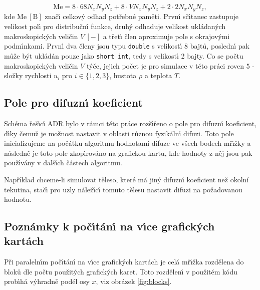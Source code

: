         \begin{equation}
            \mathrm{Me} = 8 \cdot 68 N_x N_y N_z + 8 \cdot V N_x N_y N_z + 2 \cdot 2 N_x N_y N_z,
        \end{equation}
        kde $\mathrm{Me} \ [\mathrm{B}]$ zna\v{c}\'{\i} celkov\'{y} odhad pot\v{r}ebn\'{e} pam\v{e}ti. Prvn\'{\i} s\v{c}\'{\i}tanec zastupuje velikost pol\'{\i} pro distribu\v{c}n\'{\i} funkce, druh\'{y} odhaduje velikost ukl\'{a}dan\'{y}ch makroskopick\'{y}ch veli\v{c}in $V \ [-]$ a t\v{r}et\'{\i} \v{c}len aproximuje pole s okrajov\'{y}mi podm\'{\i}nkami. Prvn\'{\i} dva \v{c}leny jsou typu \texttt{\lstinline{double}} s velikost\'{\i} 8 bajt\r{u}, posledn\'{\i} pak m\r{u}\v{z}e b\'{y}t ukl\'{a}d\'{a}n pouze jako \texttt{\lstinline{short int}}, tedy s velikost\'{\i} 2 bajty. Co se po\v{c}tu makroskopick\'{y}ch veli\v{c}in $V$ t\'{y}\v{c}e, jejich po\v{c}et je pro simulace v t\'{e}to pr\'{a}ci roven $5$ - slo\v{z}ky rychlosti $u_i$ pro $i \in \{1,2,3\}$, hustota $\rho$ a teplota $T$.

        \subsection{Pole pro difuzn\'{\i} koeficient}
            
            Sch\'{e}ma \v{r}e\v{s}\'{\i}c\'{\i} ADR bylo v r\'{a}mci t\'{e}to pr\'{a}ce roz\v{s}\'{\i}\v{r}eno o pole pro difuzn\'{\i} koeficient, d\'{\i}ky \v{c}emu\v{z} je mo\v{z}nost nastavit v oblasti r\r{u}znou fyzik\'{a}ln\'{\i} difuzi. Toto pole inicializujeme na po\v{c}\'{a}tku algoritmu hodnotami difuze ve v\v{s}ech bodech m\v{r}\'{\i}\v{z}ky a n\'{a}sledn\v{e} je toto pole zkop\'{\i}rov\'{a}no na grafickou kartu, kde hodnoty z n\v{e}j jsou pak pou\v{z}\'{\i}v\'{a}ny v dal\v{s}\'{\i}ch \v{c}\'{a}stech algoritmu. 

            Nap\v{r}\'{\i}klad chceme-li simulovat t\v{e}leso, kter\'{e} m\'{a} jin\'{y} difuzn\'{\i} koeficient ne\v{z} okoln\'{i} tekutina, sta\v{c}\'{\i} pro uzly n\'{a}le\v{z}\'{\i}c\'{\i} tomuto t\v{e}lesu nastavit difuzi na po\v{z}adovanou hodnotu.

        \subsection{Pozn\'{a}mky k po\v{c}\'{\i}t\'{a}n\'{\i} na v\'{\i}ce grafick\'{y}ch kart\'{a}ch}

            P\v{r}i paraleln\'{\i}m po\v{c}\'{\i}t\'{a}n\'{\i} na v\'{\i}ce grafick\'{y}ch kart\'{a}ch je cel\'{a} m\v{r}\'{\i}\v{z}ka rozd\v{e}lena do blok\r{u} dle po\v{c}tu pou\v{z}it\'{y}ch grafick\'{y}ch karet. Toto rozd\v{e}len\'{\i} v pou\v{z}it\'{e}m k\'{o}du prob\'{\i}h\'{a} v\'{y}hradn\v{e} pod\'{e}l osy $x$, viz obr\'{a}zek \ref{fig:blocks}.
            

